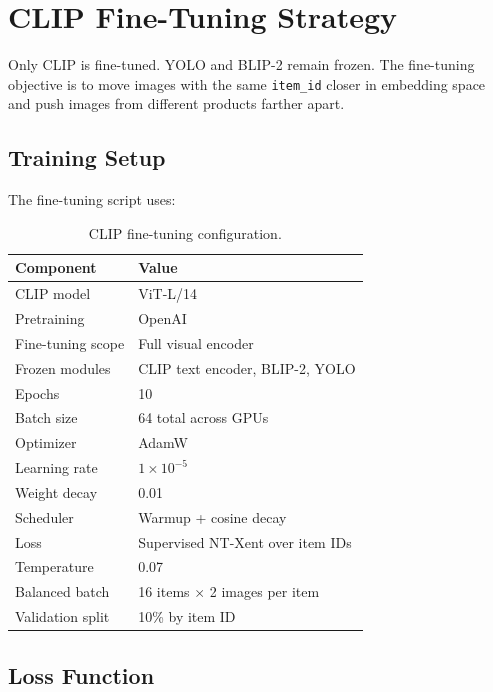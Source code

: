 \documentclass[12pt, a4paper]{article}
\begin{document}
\section{CLIP Fine-Tuning Strategy}

Only CLIP is fine-tuned. YOLO and BLIP-2 remain frozen. The fine-tuning objective is to move images with the same \texttt{item\_id} closer in embedding space and push images from different products farther apart.

\subsection{Training Setup}

The fine-tuning script uses:

\begin{table}[H]
    \centering
    \caption{CLIP fine-tuning configuration.}
    \label{tab:training-config}
    \begin{tabular}{ll}
        \toprule
        Component & Value \\
        \midrule
        CLIP model & ViT-L/14 \\
        Pretraining & OpenAI \\
        Fine-tuning scope & Full visual encoder \\
        Frozen modules & CLIP text encoder, BLIP-2, YOLO \\
        Epochs & 10 \\
        Batch size & 64 total across GPUs \\
        Optimizer & AdamW \\
        Learning rate & $1\times10^{-5}$ \\
        Weight decay & 0.01 \\
        Scheduler & Warmup + cosine decay \\
        Loss & Supervised NT-Xent over item IDs \\
        Temperature & 0.07 \\
        Balanced batch & 16 items $\times$ 2 images per item \\
        Validation split & 10\% by item ID \\
        \bottomrule
    \end{tabular}
\end{table}

\subsection{Loss Function}
\end{document}
